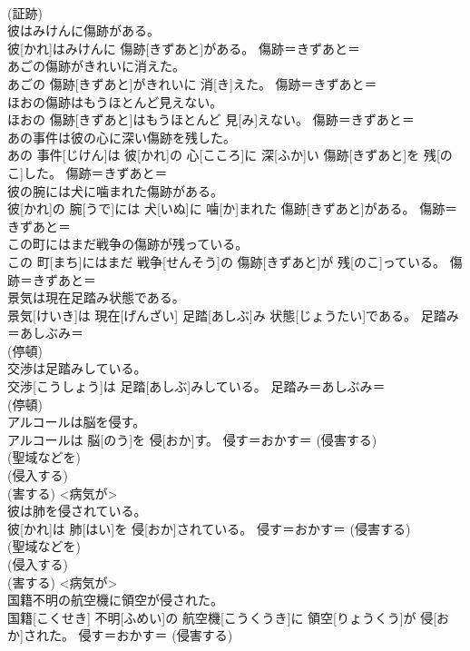 \documentclass[8pt]{extreport}
\begin{document}
\begin{CJK}{UTF8}{min}
{\\	(証跡) 
\\	彼はみけんに傷跡がある。	
\\	彼[かれ]はみけんに 傷跡[きずあと]がある。	傷跡＝きずあと＝ 
\\	あごの傷跡がきれいに消えた。	
\\	あごの 傷跡[きずあと]がきれいに 消[き]えた。	傷跡＝きずあと＝ 
\\	ほおの傷跡はもうほとんど見えない。	
\\	ほおの 傷跡[きずあと]はもうほとんど 見[み]えない。	傷跡＝きずあと＝ 
\\	あの事件は彼の心に深い傷跡を残した。	
\\	あの 事件[じけん]は 彼[かれ]の 心[こころ]に 深[ふか]い 傷跡[きずあと]を 残[のこ]した。	傷跡＝きずあと＝ 
\\	彼の腕には犬に噛まれた傷跡がある。	
\\	彼[かれ]の 腕[うで]には 犬[いぬ]に 噛[か]まれた 傷跡[きずあと]がある。	傷跡＝きずあと＝ 
\\	この町にはまだ戦争の傷跡が残っている。	
\\	この 町[まち]にはまだ 戦争[せんそう]の 傷跡[きずあと]が 残[のこ]っている。	傷跡＝きずあと＝ 
\\	景気は現在足踏み状態である。	
\\	景気[けいき]は 現在[げんざい] 足踏[あしぶ]み 状態[じょうたい]である。	足踏み＝あしぶみ＝ 
\\	(停頓) 
\\	交渉は足踏みしている。	
\\	交渉[こうしょう]は 足踏[あしぶ]みしている。	足踏み＝あしぶみ＝ 
\\	(停頓) 
\\	アルコールは脳を侵す。	
\\	アルコールは 脳[のう]を 侵[おか]す。	侵す＝おかす＝ (侵害する) 
\\	(聖域などを) 
\\	(侵入する) 
\\	(害する) <病気が> 
\\	彼は肺を侵されている。	
\\	彼[かれ]は 肺[はい]を 侵[おか]されている。	侵す＝おかす＝ (侵害する) 
\\	(聖域などを) 
\\	(侵入する) 
\\	(害する) <病気が> 
\\	国籍不明の航空機に領空が侵された。	
\\	国籍[こくせき] 不明[ふめい]の 航空機[こうくうき]に 領空[りょうくう]が 侵[おか]された。	侵す＝おかす＝ (侵害する) 
}
\end{CJK}
\end{document}
